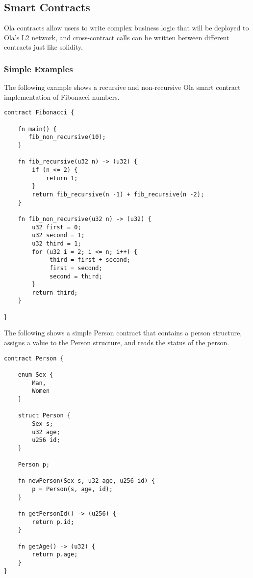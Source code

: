 \subsection{Smart Contracts}


Ola contracts allow users to write complex business logic that will be deployed to Ola's L2 network, and cross-contract calls can be written between different contracts just like solidity.

\subsubsection{Simple Examples}

The following example shows a recursive and non-recursive Ola smart contract implementation of Fibonacci numbers.

\begin{lstlisting}
contract Fibonacci {

    fn main() {
       fib_non_recursive(10);
    }

    fn fib_recursive(u32 n) -> (u32) {
        if (n <= 2) {
            return 1;
        }
        return fib_recursive(n -1) + fib_recursive(n -2);
    }

    fn fib_non_recursive(u32 n) -> (u32) {
        u32 first = 0;
        u32 second = 1;
        u32 third = 1;
        for (u32 i = 2; i <= n; i++) {
             third = first + second;
             first = second;
             second = third;
        }
        return third;
    }

}
\end{lstlisting}

The following shows a simple Person contract that contains a person structure, assigns a value to the Person structure, and reads the status of the person.

\begin{lstlisting}
contract Person {

    enum Sex {
        Man,
        Women
    }

    struct Person {
        Sex s;
        u32 age;
        u256 id;
    }

    Person p;

    fn newPerson(Sex s, u32 age, u256 id) {
        p = Person(s, age, id);
    }

    fn getPersonId() -> (u256) {
        return p.id;
    }

    fn getAge() -> (u32) {
        return p.age;
    }
}
\end{lstlisting}

